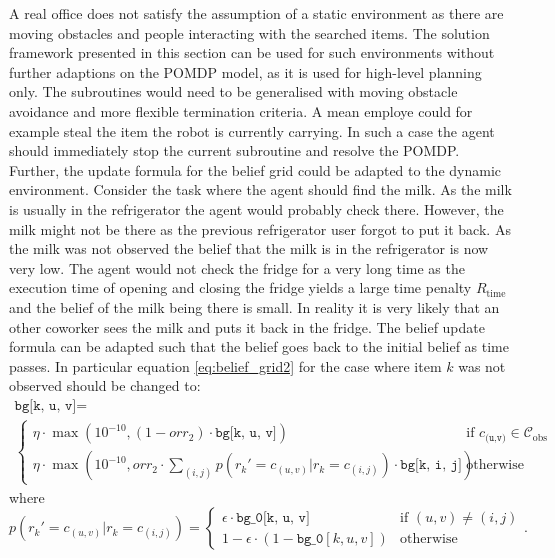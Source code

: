 A real office does not satisfy the assumption of a static environment as there are moving obstacles and people interacting with the searched items. 
The solution framework presented in this section can be used for such environments without further adaptions on the POMDP model, as it is used for high-level planning only. The subroutines would need to be generalised with moving obstacle avoidance and more flexible termination criteria. A mean employe could for example steal the item the robot is currently carrying. In such a case the agent should immediately stop the current subroutine and resolve the POMDP. Further, the update formula for the belief grid could be adapted to the dynamic environment. Consider the task where the agent should find the milk. As the milk is usually in the refrigerator the agent would probably check there. However, the milk might not be there as the previous refrigerator user forgot to put it back. As the milk was not observed the belief that the milk is in the refrigerator is now very low. The agent would not check the fridge for a very long time as the execution time of opening and closing the fridge yields a large time penalty $R_\text{time}$ and the belief of the milk being there is small. In reality it is very likely that an other coworker sees the milk and puts it back in the fridge. The belief update formula can be adapted such that the belief goes back to the initial belief as time passes. In particular equation \ref{eq:belief_grid2} for the case where item $k$ was not observed should be changed to:
\begin{multline}
    \texttt{bg[k, u, v]} = \\
    \begin{cases} 
        \eta \cdot\max\left(10^{-10}, (1 -  orr_2) \cdot \texttt{bg[k, u, v]}\right) &\text{if }c_\texttt{(u,v)} \in \mathcal{C}_\text{obs}\\
        \eta \cdot \max\left(10^{-10}, orr_2 \cdot \sum_{(i,j)}p(r_k'=c_{(u,v)}|r_k=c_{(i,j)}) \cdot \texttt{bg[k, i, j]}\right) &\text{otherwise}
    \end{cases}
\end{multline}
where 
\begin{equation}
    p(r_k'=c_{(u,v)}|r_k=c_{(i,j)}) = \begin{cases}
    \epsilon \cdot \texttt{bg\_0[k, u, v]} &\text{if } (u,v)\neq (i,j)\\
    1 - \epsilon \cdot (1-\texttt{bg\_0}[k, u, v]) &\text{otherwise}
    \end{cases}.
\end{equation}

